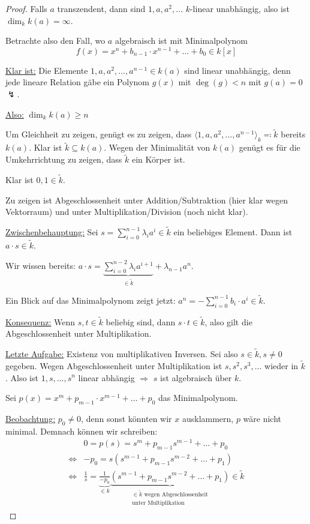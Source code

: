\documentclass[a4paper,12pt,numbers=noenddot,parskip=full]{scrartcl}
\newcommand{\heading}{\underline}
\theoremstyle{dotless}
\theoremstyle{remark}
\begin{document}
	\begin{proof}
		Falls $a$ transzendent, dann sind $1,a,a^2,\dots$ $k$-linear unabhängig, also ist $\dim_k k(a) = \infty$.
		
		Betrachte also den Fall, wo $a$ algebraisch ist mit Minimalpolynom 
		\begin{equation*}
			f(x) = x^n + b_{n-1} \cdot x^{n-1} + \dots + b_0 \in k[x]
		\end{equation*}
		
		\heading{Klar ist:} Die Elemente $1,a,a^2, \dots, a^{n-1} \in k(a)$ 
		sind linear unabhängig, denn jede lineare Relation gäbe ein Polynom $g(x)$ mit $\deg (g) < n$ mit $g(a) = 0$ $\lightning$.
		
		\heading{Also:} $\dim_k k(a) \geq n$
		
		Um Gleichheit zu zeigen, genügt es zu zeigen, dass $\langle 1, a, a^2, \dots, a^{n-1} \rangle_k \eqqcolon \tilde{k}$ bereits $k(a)$. Klar ist $\tilde{k} \subseteq k(a)$. Wegen der Minimalität von $k(a)$ genügt es für die Umkehrrichtung zu zeigen, dass $\tilde{k}$ ein Körper ist.
		
		Klar ist $0,1 \in \tilde{k}$.
		
		Zu zeigen ist Abgeschlossenheit unter Addition/Subtraktion (hier klar wegen Vektorraum) und unter Multiplikation/Division (noch nicht klar).
		
		\heading{Zwischenbehauptung:} Sei $s = \sum_{i=0}^{n-1} \lambda_i a^i \in \tilde{k}$ ein beliebiges Element. Dann ist $a \cdot s \in \tilde{k}$.
		
		Wir wissen bereits:
		$
			a \cdot s = \underbrace{\sum_{i=0}^{n-2} \lambda_i a^{i+1}}_{\in \tilde{k}} + \lambda_{n-1} a^n
		$.
		
		Ein Blick auf das Minimalpolynom zeigt jetzt:
		$
			a^n = - \sum_{i = 0}^{n-1} b_i \cdot a^i \in \tilde{k}
		$.
		
		\heading{Konsequenz:} Wenn $s,t \in \tilde{k}$ beliebig sind, dann $s \cdot t \in \tilde{k}$, also gilt die Abgeschlossenheit unter Multiplikation.
		
		\heading{Letzte Aufgabe:} Existenz von multiplikativen Inversen. Sei also $s \in \tilde{k}, s \neq 0$ gegeben. Wegen Abgeschlossenheit unter Multiplikation ist $s, s^2, s^3, \dots$ wieder in $\tilde{k}$. Also ist $1,s, \dots, s^n$ linear abhängig $\Rightarrow$ $s$ ist algebraisch über $k$.
		
		Sei $p(x) = x^m + p_{m-1} \cdot x^{m-1} + \dots + p_0$ das Minimalpolynom.
		
		\heading{Beobachtung:} $p_0 \neq 0$, denn sonst könnten wir $x$ ausklammern, $p$ wäre nicht minimal. Demnach können wir schreiben:
		\begin{align*}
			&0 = p(s) = s^m + p_{m-1} s^{m-1} + \dots + p_0 \\
			\Leftrightarrow& - p_0 = s(s^{m-1} + p_{m-1} s^{m-2} + \dots + p_1) \\
			\Leftrightarrow& \frac{1}{s} = \underbrace{\frac{1}{-p_0}}_{\in k} \underbrace{(s^{m-1} + p_{m-1} s^{m-2} + \dots + p_1)}_{\substack{\text {$\in \tilde{k}$ wegen Abgeschlossenheit} \\ \text{unter Multiplikation}}} \in \tilde{k}
		\end{align*}
	\end{proof}
\end{document}
